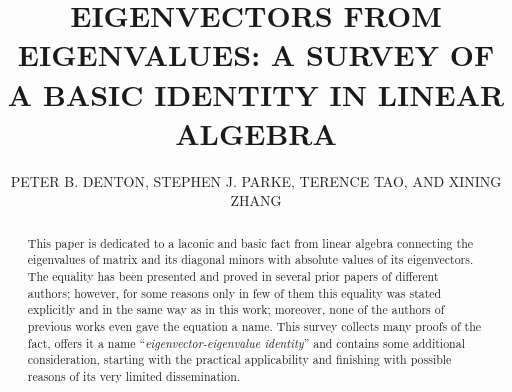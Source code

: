 \documentclass[12pt]{article}
\title{EIGENVECTORS FROM EIGENVALUES: A SURVEY OF A BASIC IDENTITY IN LINEAR ALGEBRA}
\author{PETER B. DENTON, STEPHEN J. PARKE, TERENCE TAO, AND XINING ZHANG}
\date{}
\begin{document}
\maketitle\thispagestyle{empty}
\begin{abstract}
This paper is dedicated to a laconic and basic fact from linear algebra connecting the eigenvalues of matrix and its diagonal minors with absolute values of its eigenvectors. The equality has been presented and proved in several prior papers of different authors; however, for some reasons only in few of them this equality was stated explicitly and in the same way as in this work; moreover, none of the authors of previous works even gave the equation a name. This survey collects many proofs of the fact, offers it a name ``\textit{eigenvector-eigenvalue identity}'' and contains some additional consideration, starting with the practical applicability and finishing with possible reasons of its very limited dissemination.
\end{abstract}
\end{document}

